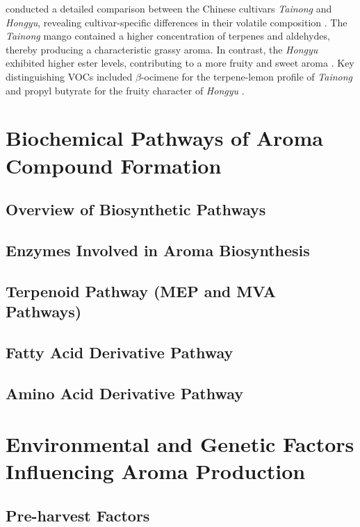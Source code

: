 \vspace{1em}
\textcite{A15_Xie2023} conducted a detailed comparison between the Chinese cultivars \textit{Tainong} and \textit{Hongyu}, revealing cultivar-specific differences in their volatile composition \cite*{A15_Xie2023}. The \textit{Tainong} mango contained a higher concentration of terpenes and aldehydes, thereby producing a characteristic grassy aroma.  In contrast, the \textit{Hongyu} exhibited higher ester levels, contributing to a more fruity and sweet aroma \cite*{A15_Xie2023}. Key distinguishing VOCs included $\beta$-ocimene for the terpene-lemon profile of \textit{Tainong} and propyl butyrate for the fruity character of \textit{Hongyu} \cite*{A15_Xie2023}.



\section{Biochemical Pathways of Aroma Compound Formation}

\subsection{Overview of Biosynthetic Pathways}

\subsection{Enzymes Involved in Aroma Biosynthesis}

\subsection{Terpenoid Pathway (MEP and MVA Pathways)}

\subsection{Fatty Acid Derivative Pathway}

\subsection{Amino Acid Derivative Pathway}


\section{Environmental and Genetic Factors Influencing Aroma Production}
\subsection{Pre-harvest Factors}

